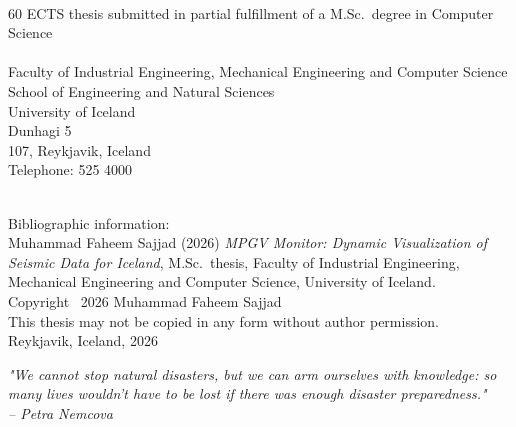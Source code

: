 \documentclass[12pt]{article}
\begin{document}

\clearpage
\thispagestyle{empty}
\vspace*{\fill}
\renewcommand{\baselinestretch}{1.5}\normalsize
{} \\
60 ECTS thesis submitted in partial fulfillment of a M.Sc.\ degree in Computer Science \\ \\
Faculty of Industrial Engineering, Mechanical Engineering and Computer Science \\
School of Engineering and Natural Sciences \\
University of Iceland \\
Dunhagi 5 \\
107, Reykjavik, Iceland \\
Telephone: 525 4000 \\ \\

\vspace*{\lineskip}

Bibliographic information: \\
Muhammad Faheem Sajjad (2026) \emph{MPGV Monitor: Dynamic Visualization of Seismic Data for Iceland}, M.Sc.\ thesis, Faculty of Industrial Engineering, Mechanical Engineering and Computer Science, University of Iceland.\\

Copyright \textcopyright~2026 Muhammad Faheem Sajjad \\
This thesis may not be copied in any form without author permission.\\

Reykjavik, Iceland, 2026 \\
\renewcommand{\baselinestretch}{1.0}\normalsize
\newpage


\clearpage
\null
\thispagestyle{empty} %
\newpage

\thispagestyle{empty}
\vfill %
\begin{flushright}
\textit{"We cannot stop natural disasters, but we can arm ourselves with knowledge: so many lives wouldn’t have to be lost if there was enough disaster preparedness."}\\
\textit{– Petra Nemcova}
\end{flushright}
\end{document}
